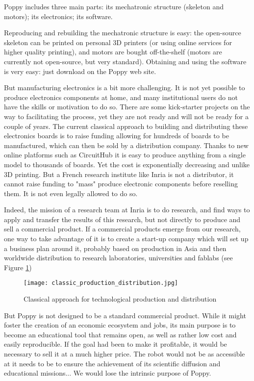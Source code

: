 Poppy includes three main parts: its mechatronic structure (skeleton and motors); its electronics; its software.

Reproducing and rebuilding the mechatronic structure is easy: the open-source skeleton can be printed on personal 3D printers (or using online services for higher quality printing), and motors are bought off-the-shelf (motors are currently not open-source, but very standard). Obtaining and using the software is very easy: just download on the Poppy web site.

But manufacturing electronics is a bit more challenging. It is not yet possible to produce electronics components at home, and many institutional users do not have the skills or motivation to do so. There are some kick-starter projects on the way to facilitating the process, yet they are not ready and will not be ready for a couple of years. The current classical approach to building and distributing these electronics boards is to raise funding allowing for hundreds of boards to be manufactured, which can then be sold by a distribution company. Thanks to new online platforms such as CircuitHub it is easy to produce anything from a single model to thousands of boards. Yet the cost is exponentially decreasing and unlike 3D printing. But a French research institute like Inria is not a distributor, it cannot raise funding to "mass" produce electronic components before reselling them. It is not even legally allowed to do so.

Indeed, the mission of a research team at Inria is to do research, and find ways to apply and transfer the results of this research, but not directly to produce and sell a commercial product. If a commercial products emerge from our research, one way to take advantage of it is to create a start-up company which will set up a business plan around it, probably based on production in Asia and then worldwide distribution to research laboratories, universities and fablabs (see Figure \ref{fig:classic})

\begin{figure}[ht]
    \begin{center}
        \texttt{[image: classic\_production\_distribution.jpg]}
    \end{center}
    \caption{Classical approach for technological production and distribution}
    \label{fig:classic}
\end{figure}

But Poppy is not designed to be a standard commercial product. While it might foster the creation of an economic ecosystem and jobs, its main purpose is to become an educational tool that remains open, as well as rather low cost and easily reproducible. If the goal had been to make it profitable, it would be necessary to sell it at a much higher price. The robot would not be as accessible at it needs to be to ensure the achievement of its scientific diffusion and educational missions... We would lose the intrinsic purpose of Poppy.

